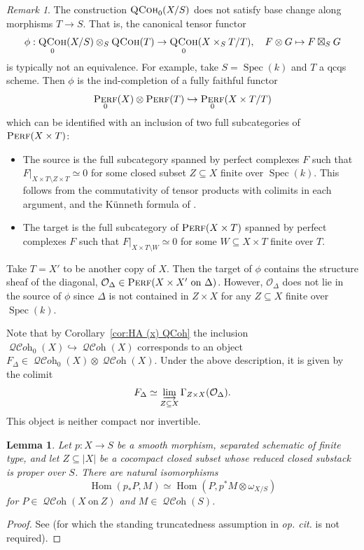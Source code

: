 \documentclass[12pt, oneside]{amsart}
\numberwithin{equation}{section}
\newtheorem{lemma}[subsubsection]{Lemma}
\theoremstyle{remark}
\newtheorem{remark}[subsubsection]{Remark}
\theoremstyle{plain}
\DeclareMathOperator{\QCoh}{\textsc{QCoh}}
\DeclareMathOperator{\QCOH}{\mathcal{QC}\textit{oh}}
\DeclareMathOperator{\Perf}{\textsc{Perf}}
\DeclareMathOperator{\Hom}{Hom}
\newcommand{\OO}{\mathcal{O}}
\DeclareMathOperator{\spc}{Spec}
\begin{document}
\begin{remark} The construction $\QCoh_0(X/S)$ does not satisfy base change along morphisms $T \to S$. That is, the canonical tensor functor
\[ \phi : \QCoh_0(X/S)\otimes_S \QCoh(T) \to \QCoh_0({X \times_S T/T}), \quad F \otimes G \mapsto F \boxtimes_S G\]
is typically not an equivalence. For example, take $S=\spc(k)$ and $T$ a qcqs scheme. Then $\phi$ is the ind-completion of a fully faithful functor
\[ \Perf_0(X) \otimes \Perf(T) \hookrightarrow \Perf_0(X\times T/T) \]
which can be identified with an inclusion of two full subcategories of $\Perf(X\times T)$:
\begin{itemize}
\item
The source is the full subcategory spanned by perfect complexes $F$ such that $F|_{X\times T\setminus Z\times T} \simeq 0$ for some closed subset $Z \subseteq X$ finite over $\spc(k)$.
This follows from the commutativity of tensor products with colimits in each argument, and the K\"unneth formula of \cite[Thm.~1.2(1)]{BFN}.

\item
The target is the full subcategory of $\Perf(X\times T)$ spanned by perfect complexes $F$ such that $F|_{X\times T\setminus W} \simeq 0$ for some $W \subseteq X \times T$ finite over $T$.
\end{itemize}
Take $T=X'$ to be another copy of $X$. Then the target of $\phi$ contains the structure sheaf of the diagonal, $\OO_{\Delta} \in \Perf(X \times X'~\mathrm{on}~\Delta)$. However, $\OO_{\Delta}$ does not lie in the source of $\phi$ since $\Delta$ is not contained in $Z \times X$ for any $Z \subseteq X$ finite over $\spc(k)$.

Note that by Corollary~\ref{cor:HA (x) QCoh} the inclusion $\QCOH_0(X) \hookrightarrow \QCOH(X)$ corresponds to an object $F_\Delta \in \QCOH_0(X) \otimes \QCOH(X)$.
Under the above description, it is given by the colimit
\[ F_\Delta \simeq \varinjlim_{Z\subseteq X} \Gamma_{Z\times X}(\OO_{\Delta}). \]
This object is neither compact nor invertible. \end{remark}

\begin{lemma}\label{lem:duality with proper supports}
  Let $p : X \to S$ be a smooth morphism, separated schematic of finite type, and let $Z\subseteq |X|$ be a cocompact closed subset whose reduced closed substack is proper over $S$.
  There are natural isomorphisms
  \[
    \Hom(p_*P, M) \simeq \Hom(P, p^*M \otimes \omega_{X/S})
  \]
  for $P\in\QCOH(X~\mathrm{on}~Z)$ and $M\in\QCOH(S)$.
\end{lemma}
\begin{proof}
  See \cite[Thm.~3.2.16, Rem.~3.2.17, Cor.~3.2.18]{JiangThesis} (for which the standing truncatedness assumption in \emph{op. cit.} is not required).
\end{proof}
\end{document}
